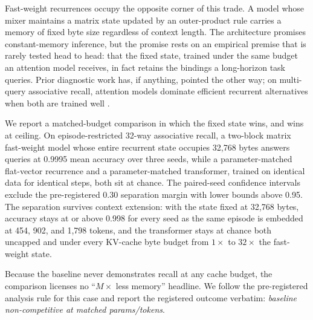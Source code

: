 \documentclass{article}
\begin{document}
Fast-weight recurrences occupy the opposite corner of this trade. A model
whose mixer maintains a matrix state updated by an outer-product rule
\citep{schmidhuber1992learning, ba2016using, schlag2021linear,
katharopoulos2020transformers, yang2024parallelizing, gu2023mamba} carries a
memory of fixed byte size regardless of context length. The architecture
promises constant-memory inference, but the promise rests on an empirical
premise that is rarely tested head to head: that the fixed state, trained
under the same budget an attention model receives, in fact retains the
bindings a long-horizon task queries. Prior diagnostic work has, if
anything, pointed the other way; on multi-query associative recall,
attention models dominate efficient recurrent alternatives when both are
trained well \citep{arora2023zoology}.

We report a matched-budget comparison in which the fixed state wins, and
wins at ceiling. On episode-restricted 32-way associative recall, a
two-block matrix fast-weight model whose entire recurrent state occupies
32{,}768 bytes %
answers queries at 0.9995 mean accuracy over three seeds, %
while a parameter-matched flat-vector recurrence and a parameter-matched
transformer, trained on identical data for identical steps, both sit at
chance. %
The paired-seed confidence intervals exclude the pre-registered 0.30
separation margin with lower bounds above 0.95. %
The separation survives context extension: with the state fixed at
32{,}768 bytes, accuracy stays at or above 0.998 for every seed as the same
episode is embedded at 454, 902, and 1{,}798 tokens, %
and the transformer stays at chance both uncapped and under every KV-cache
byte budget from $1\times$ to $32\times$ the fast-weight state. %

Because the baseline never demonstrates recall at any cache budget, the
comparison licenses no ``$M\times$ less memory'' headline. We follow the
pre-registered analysis rule for this case and report the registered
outcome verbatim: \emph{baseline non-competitive at matched
params/tokens}. %
\end{document}

